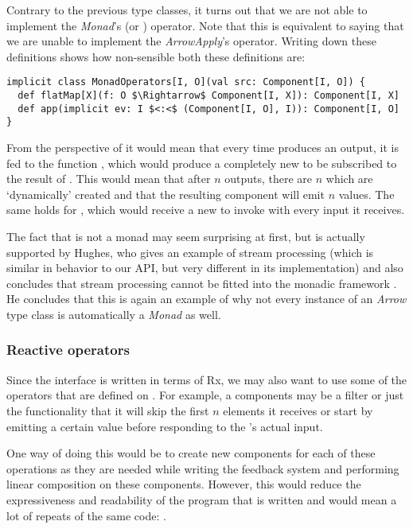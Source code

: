 Contrary to the previous type classes, it turns out that we are not able to implement the \textit{Monad}'s \code{(>>=)} (or ) operator. Note that this is equivalent to saying that we are unable to implement the \textit{ArrowApply}'s  operator. Writing down these definitions shows how non-sensible both these definitions are:

\begin{lstlisting}[style=InlineScalaStyle]
implicit class MonadOperators[I, O](val src: Component[I, O]) {
  def flatMap[X](f: O $\Rightarrow$ Component[I, X]): Component[I, X]
  def app(implicit ev: I $<:<$ (Component[I, O], I)): Component[I, O]
}
\end{lstlisting}

From the perspective of  it would mean that every time  produces an output, it is fed to the function , which would produce a completely new \comp to be subscribed to the result of . This would mean that after $n$ outputs, there are $n$ \comp which are `dynamically' created and that the resulting component will emit $n$ values. The same holds for , which would receive a new \comp to invoke with every input it receives.

The fact that \comp is not a monad may seem surprising at first, but is actually supported by Hughes, who gives an example of stream processing (which is similar in behavior to our API, but very different in its implementation) and also concludes that stream processing cannot be fitted into the monadic framework . He concludes that this is again an example of why not every instance of an \textit{Arrow} type class is automatically a \textit{Monad} as well.

\subsubsection{Reactive operators}
Since the \comp interface is written in terms of Rx, we may also want to use some of the operators that are defined on \obs. For example, a components may be a filter or just the functionality that it will skip the first $n$ elements it receives or start by emitting a certain value before responding to the \comp's actual input.

One way of doing this would be to create new components for each of these operations as they are needed while writing the feedback system and performing linear composition on these components. However, this would reduce the expressiveness and readability of the program that is written and would mean a lot of repeats of the same code: .


